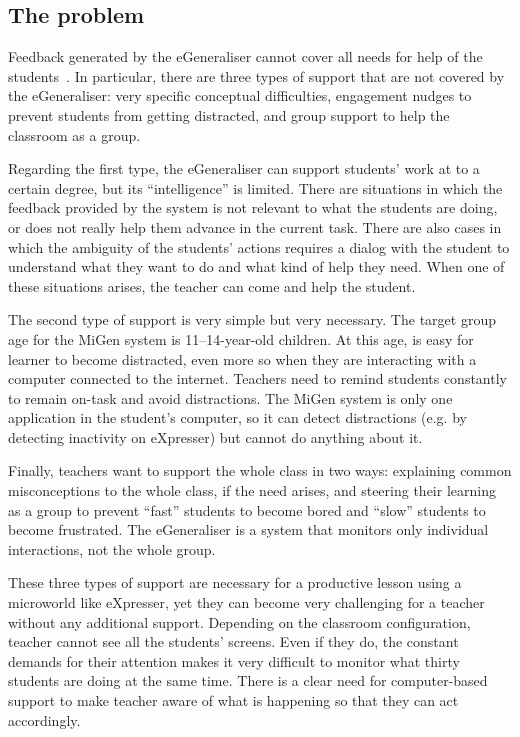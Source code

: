 \subsection{The problem}
\label{sec:problem}

Feedback generated by the eGeneraliser cannot cover all needs for help
of the students~\cite{ISmetrics}. In particular, there are three types
of support that are not covered by the eGeneraliser: very specific
conceptual difficulties, engagement nudges to prevent students from
getting distracted, and group support to help the classroom as a
group.

Regarding the first type, the eGeneraliser can support students' work
at to a certain degree, but its ``intelligence'' is limited. There are
situations in which the feedback provided by the system is not
relevant to what the students are doing, or does not really help them
advance in the current task. There are also cases in which the
ambiguity of the students' actions requires a dialog with the student
to understand what they want to do and what kind of help they
need. When one of these situations arises, the teacher can come and
help the student. 

The second type of support is very simple but very necessary. The
target group age for the MiGen system is 11--14-year-old children. At
this age, is easy for learner to become distracted, even more so when
they are interacting with a computer connected to the
internet. Teachers need to remind students constantly to remain
on-task and avoid distractions. The MiGen system is only one
application in the student's computer, so it can detect distractions
(e.g. by detecting inactivity on eXpresser) but cannot do anything
about it. 

Finally, teachers want to support the whole class in two ways:
explaining common misconceptions to the whole class, if the need
arises, and steering their learning as a group to prevent ``fast''
students to become bored and ``slow'' students to become
frustrated. The eGeneraliser is a system that monitors only
individual interactions, not the whole group. 

These three types of support are necessary for a productive lesson
using a microworld like eXpresser, yet they can become very
challenging for a teacher without any additional support. Depending on
the classroom configuration, teacher cannot see all the students'
screens. Even if they do, the constant demands for their attention
makes it very difficult to monitor what thirty students are doing at
the same time. There is a clear need for computer-based support to
make teacher aware of what is happening so that they can act
accordingly. 

